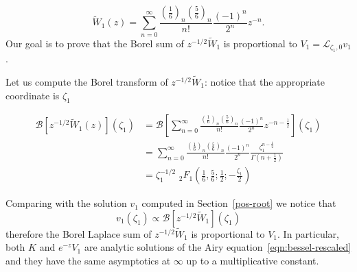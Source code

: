 \documentclass{article}
\begin{document}
\begin{equation}
\tilde{W}_1(z)=\sum_{n=0}^{\infty}\frac{\left(\frac{1}{6}\right)_n\left(\frac{5}{6}\right)_n}{n!}\frac{(-1)^n}{2^n}z^{-n}.
\end{equation}
Our goal is to prove that the Borel sum of $z^{-1/2}\tilde{W}_1$ is proportional to $V_1=\mathcal{L}_{\zeta_1,0}v_1$. 
%
%
%
%

Let us compute the Borel transform of $z^{-1/2}\tilde{W}_1$: notice that the appropriate coordinate is $\zeta_1$ 

\begin{align*}
\mathcal{B}\left[z^{-1/2}\tilde{W}_1(z)\right](\zeta_1)&=\mathcal{B}\left[\sum_{n=0}^{\infty}\frac{\left(\frac{1}{6}\right)_n\left(\frac{5}{6}\right)_n}{n!}\frac{(-1)^n}{2^n}z^{-n-\frac{1}{2}} \right](\zeta_1)\\
&=\sum_{n=0}^{\infty}\frac{\left(\frac{1}{6}\right)_n\left(\frac{5}{6}\right)_n}{n!}\frac{(-1)^n}{2^n}\frac{\zeta_1^{n-\frac{1}{2}}}{\Gamma(n+\frac{1}{2})}\\
&=\zeta_1^{-1/2}\,\, {}_2F_1\left(\frac{1}{6},\frac{5}{6};\frac{1}{2};-\frac{\zeta_1}{2}\right)
\end{align*}

Comparing with the solution $v_1$ computed in Section~\ref{pos-root} we notice that \[v_1(\zeta_1)\propto \mathcal{B}\left[z^{-1/2}\tilde{W}_1\right](\zeta_1)\]
therefore the Borel Laplace sum of $z^{-1/2}\tilde{W}_1$ is proportional to $V_1$. In particular, both $K$ and $e^{-z}V_1$ are analytic solutions of the Airy equation~\eqref{eqn:bessel-rescaled} and they have the same asymptotics at $\infty$ up to a multiplicative constant. 
\end{document}
